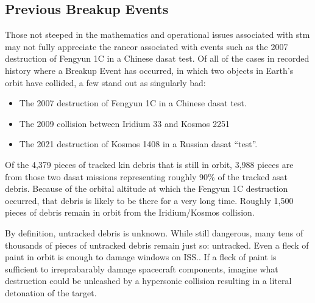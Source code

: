 \subsection{Previous Breakup Events}

Those not steeped in the mathematics and operational issues associated
with \ac{stm} may not fully appreciate the rancor associated with
events such as the 2007 destruction of Fengyun 1C in a Chinese
\ac{dasat} test.  Of all of the cases in recorded history where a
Breakup Event has occurred, in which two objects in Earth's orbit have
collided, a few stand out as singularly bad:

\begin{itemize}

\item The 2007 destruction of Fengyun 1C in a Chinese \ac{dasat} test.

\item The 2009 collision between Iridium 33 and Kosmos 2251

\item The 2021 destruction of Kosmos 1408 in a Russian \ac{dasat} ``test''.

\end{itemize}

Of the 4,379 pieces of tracked \ac{kin} debris that is still in orbit,
3,988 pieces are from those two \ac{dasat} missions representing
roughly 90\% of the tracked \ac{asat} debris.\cite[Table 5-1,
  p05-01]{brian} Because of the orbital altitude at which the Fengyun
1C destruction occurred, that debris is likely to be there for a very
long time.\cite{osa-debris} Roughly 1,500 pieces of debris remain in
orbit from the Iridium/Kosmos collision.

By definition, untracked debris is unknown.  While still dangerous,
many tens of thousands of pieces of untracked debris remain just so:
untracked.\cite[p05-01]{brian} Even a fleck of paint in orbit is
enough to damage windows on ISS.\cite[dig this one up]{xxx}.  If a
fleck of paint is sufficient to irreprabarably damage spacecraft
components, imagine what destruction could be unleashed by a
hypersonic collision resulting in a literal detonation of the
target.\cite[one of the hypersonic papers]{xxx}
